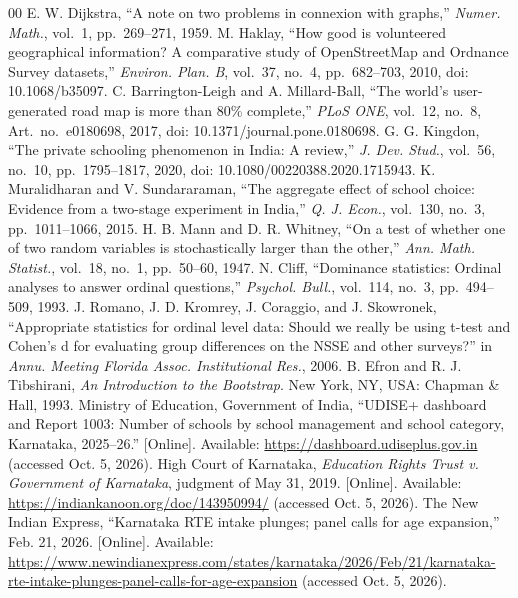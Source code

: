 \documentclass[conference]{IEEEtran}
\begin{document}
\begin{thebibliography}{00}
 E. W. Dijkstra, ``A note on two problems in connexion with graphs,'' \textit{Numer. Math.}, vol.~1, pp.~269--271, 1959.
 M. Haklay, ``How good is volunteered geographical information? A comparative study of OpenStreetMap and Ordnance Survey datasets,'' \textit{Environ. Plan. B}, vol.~37, no.~4, pp.~682--703, 2010, doi: 10.1068/b35097.
 C. Barrington-Leigh and A. Millard-Ball, ``The world's user-generated road map is more than 80\% complete,'' \textit{PLoS ONE}, vol.~12, no.~8, Art.~no.~e0180698, 2017, doi: 10.1371/journal.pone.0180698.
 G. G. Kingdon, ``The private schooling phenomenon in India: A review,'' \textit{J. Dev. Stud.}, vol.~56, no.~10, pp.~1795--1817, 2020, doi: 10.1080/00220388.2020.1715943.
 K. Muralidharan and V. Sundararaman, ``The aggregate effect of school choice: Evidence from a two-stage experiment in India,'' \textit{Q. J. Econ.}, vol.~130, no.~3, pp.~1011--1066, 2015.
 H. B. Mann and D. R. Whitney, ``On a test of whether one of two random variables is stochastically larger than the other,'' \textit{Ann. Math. Statist.}, vol.~18, no.~1, pp.~50--60, 1947.
 N. Cliff, ``Dominance statistics: Ordinal analyses to answer ordinal questions,'' \textit{Psychol. Bull.}, vol.~114, no.~3, pp.~494--509, 1993.
 J. Romano, J. D. Kromrey, J. Coraggio, and J. Skowronek, ``Appropriate statistics for ordinal level data: Should we really be using t-test and Cohen's d for evaluating group differences on the NSSE and other surveys?'' in \textit{Annu. Meeting Florida Assoc. Institutional Res.}, 2006.
 B. Efron and R. J. Tibshirani, \textit{An Introduction to the Bootstrap}. New York, NY, USA: Chapman \& Hall, 1993.
 Ministry of Education, Government of India, ``UDISE+ dashboard and Report 1003: Number of schools by school management and school category, Karnataka, 2025--26.'' [Online]. Available: \url{https://dashboard.udiseplus.gov.in} (accessed Oct. 5, 2026).
 High Court of Karnataka, \textit{Education Rights Trust v. Government of Karnataka}, judgment of May 31, 2019. [Online]. Available: \url{https://indiankanoon.org/doc/143950994/} (accessed Oct. 5, 2026).
 The New Indian Express, ``Karnataka RTE intake plunges; panel calls for age expansion,'' Feb. 21, 2026. [Online]. Available: \url{https://www.newindianexpress.com/states/karnataka/2026/Feb/21/karnataka-rte-intake-plunges-panel-calls-for-age-expansion} (accessed Oct. 5, 2026).
\end{thebibliography}
\end{document}
